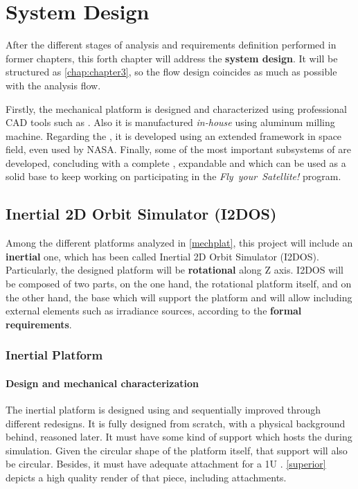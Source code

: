 \chapter{System Design} \label{chap:chapter4}

After the different stages of analysis and requirements definition performed in former chapters, this forth chapter will address the \textbf{system design}. It will be structured as \autoref{chap:chapter3}, so the flow design coincides as much as possible with the analysis flow. 

Firstly, the mechanical platform is designed and characterized using professional \acrshort{CAD} tools such as . Also it is manufactured \textit{in-house} using aluminum milling machine. Regarding the , it is developed using an extended framework in space field, even used by \acrshort{NASA}. Finally, some of the most important subsystems of  are developed, concluding with a complete , expandable and which can be used as a solid base to keep working on participating in the \textit{Fly~your~Satellite!} \cite{flyyour} program.

\section{Inertial 2D Orbit Simulator (I2DOS)} \label{i2dossec}

Among the different platforms analyzed in \autoref{mechplat}, this project will include an \textbf{inertial} one, which has been called Inertial 2D Orbit Simulator (\acrshort{I2DOS}). Particularly, the designed platform will be \textbf{rotational} along Z axis. \acrshort{I2DOS} will be composed of two parts, on the one hand, the rotational platform itself, and on the other hand, the base which will support the platform and will allow including external elements such as irradiance sources, according to the \textbf{formal requirements}.

\subsection{Inertial Platform}

\subsubsection{Design and mechanical characterization}


The inertial platform is designed using  and sequentially improved through different redesigns. It is fully designed from scratch, with a physical background behind, reasoned later. It must have some kind of support which hosts the  during simulation. Given the circular shape of the platform itself, that support will also be circular. Besides, it must have adequate attachment for a 1U . \autoref{superior} depicts a high quality render of that piece, including attachments.


